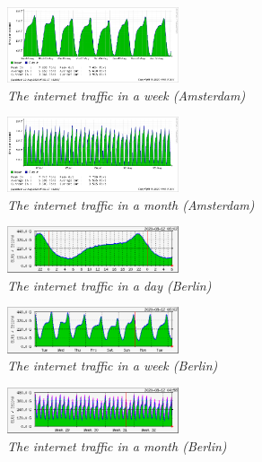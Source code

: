 \documentclass[conference]{IEEEtran}
\begin{document}
\begin{figure}[hbt!]    
    \centering
    \includegraphics[width=0.45\textwidth]{figure/amsterdam-week.png}
    \caption{\em The internet traffic in a week (Amsterdam) \cite{Amsterdam_internet_traffic} \label{fig:internet_traffic_week_Amsterdam}}
\end{figure}

\begin{figure}[hbt!]  
    \centering
    \includegraphics[width=0.45\textwidth]{figure/amsterdam-month.png}
    \caption{\em The internet traffic in a month (Amsterdam) \cite{Amsterdam_internet_traffic} \label{fig:internet_traffic_month_Amsterdam}}
\end{figure}

\begin{figure}[hbt!]
    \centering
    \includegraphics[width=0.45\textwidth]{figure/berlin-day.png}
    \caption{\em The internet traffic in a day (Berlin) \cite{Amsterdam_internet_traffic} \label{fig:internet_traffic_day_Berlin}}
\end{figure}

\begin{figure}[hbt!]
    \centering
    \includegraphics[width=0.45\textwidth]{figure/berlin-week.png}
    \caption{\em The internet traffic in a week (Berlin) \cite{Amsterdam_internet_traffic} \label{fig:internet_traffic_week_Berlin}}
\end{figure}

\begin{figure}[hbt!]
    \centering
    \includegraphics[width=0.45\textwidth]{figure/berlin-month.png}
    \caption{\em The internet traffic in a month (Berlin) \cite{Amsterdam_internet_traffic} \label{fig:internet_traffic_month_Berlin}}
\end{figure}
\end{document}
